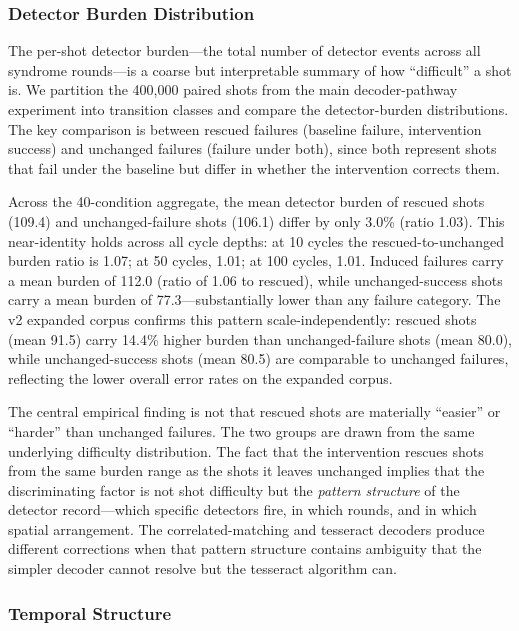 \subsubsection{Detector Burden Distribution}
\label{sec:rescued_detector_burden}

The per-shot detector burden---the total number of detector events across all syndrome rounds---is a coarse but interpretable summary of how ``difficult'' a shot is. We partition the 400,000 paired shots from the main decoder-pathway experiment into transition classes and compare the detector-burden distributions. The key comparison is between rescued failures (baseline failure, intervention success) and unchanged failures (failure under both), since both represent shots that fail under the baseline but differ in whether the intervention corrects them.

Across the 40-condition aggregate, the mean detector burden of rescued shots (109.4) and unchanged-failure shots (106.1) differ by only 3.0\% (ratio 1.03). This near-identity holds across all cycle depths: at 10 cycles the rescued-to-unchanged burden ratio is 1.07; at 50 cycles, 1.01; at 100 cycles, 1.01. Induced failures carry a mean burden of 112.0 (ratio of 1.06 to rescued), while unchanged-success shots carry a mean burden of 77.3---substantially lower than any failure category. The v2 expanded corpus confirms this pattern scale-independently: rescued shots (mean 91.5) carry 14.4\% higher burden than unchanged-failure shots (mean 80.0), while unchanged-success shots (mean 80.5) are comparable to unchanged failures, reflecting the lower overall error rates on the expanded corpus.

The central empirical finding is not that rescued shots are materially ``easier'' or ``harder'' than unchanged failures. The two groups are drawn from the same underlying difficulty distribution. The fact that the intervention rescues shots from the same burden range as the shots it leaves unchanged implies that the discriminating factor is not shot difficulty but the \emph{pattern structure} of the detector record---which specific detectors fire, in which rounds, and in which spatial arrangement. The correlated-matching and tesseract decoders produce different corrections when that pattern structure contains ambiguity that the simpler decoder cannot resolve but the tesseract algorithm can.

\subsubsection{Temporal Structure}

